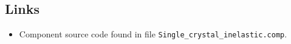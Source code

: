 \subsection*{Links}
\begin{itemize}
  \item Component source code found in file \texttt{Single\_crystal\_inelastic.comp}.
\end{itemize}
